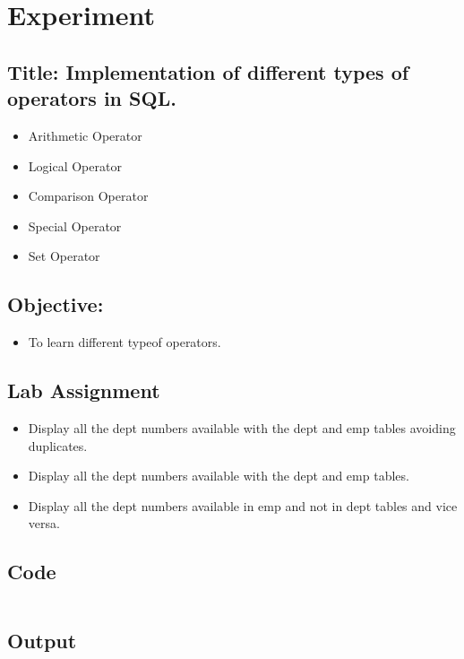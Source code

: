 \documentclass{article}
\begin{document}
\section*{Experiment \jobname}
\subsection*{\textbf{Title:} Implementation of different types of operators in SQL.}
\begin{itemize}
	\item Arithmetic Operator
	\item Logical Operator
	\item Comparison Operator
	\item Special Operator
	\item Set Operator
\end{itemize}
\subsection*{\textbf{Objective:}}
\begin{itemize}
	\item To learn different typeof operators.
\end{itemize}
\subsection*{Lab Assignment}
\begin{itemize}
	\item Display all the dept numbers available with the dept and emp tables avoiding duplicates.
	\item Display all the dept numbers available with the dept and emp tables.
	\item Display all the dept numbers available in emp and not in dept tables and vice versa.
\end{itemize}
\subsection*{Code}
\inputminted{sql}{code/\jobname.sql}
\subsection*{Output}

\end{document}
